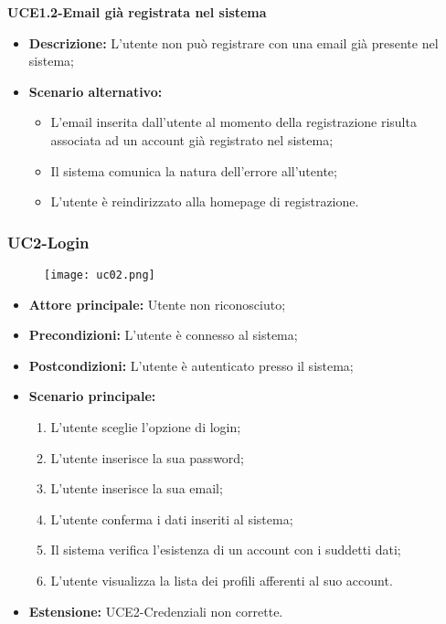 \pagebreak

\textbf{UCE1.2-Email già registrata nel sistema}
\begin{itemize}
    \item \textbf{Descrizione:} L'utente non può registrare con una email già presente nel sistema;
    \item \textbf{Scenario alternativo:}
    \begin{itemize}
        \item L'email inserita dall'utente al momento della registrazione risulta associata ad un account già registrato nel sistema;
        \item Il sistema comunica la natura dell'errore all'utente;
        \item L'utente è reindirizzato alla homepage di registrazione.
    \end{itemize}
\end{itemize}

\subsubsection{UC2-Login}
\begin{figure}[h] \texttt{[image: uc02.png]} \end{figure}
\begin{itemize}
\item \textbf{Attore principale:} Utente non riconosciuto;
\item \textbf{Precondizioni:} L'utente è connesso al sistema;
\item \textbf{Postcondizioni:} L'utente è autenticato presso il sistema;
\item \textbf{Scenario principale:}
\begin{enumerate}
    \item L'utente sceglie l'opzione di login;
    \item L'utente inserisce la sua password;
    \item L'utente inserisce la sua email;
    \item L'utente conferma i dati inseriti al sistema;
    \item Il sistema verifica l'esistenza di un account con i suddetti dati;
    \item L'utente visualizza la lista dei profili afferenti al suo account.
\end{enumerate}
    \item \textbf{Estensione:} UCE2-Credenziali non corrette.
\end{itemize}

